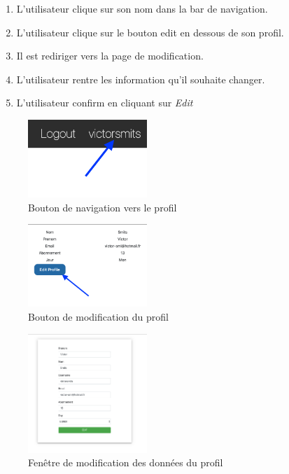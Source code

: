 \begin{enumerate}
	\item L'utilisateur clique sur son nom dans la bar de navigation.
	\item L'utilisateur clique sur le bouton edit en dessous de son profil. 
	\item Il est rediriger vers la page de modification. 
	\item L'utilisateur rentre les information qu'il souhaite changer. 
	\item L'utilisateur confirm en cliquant sur \textit{Edit}
\end{enumerate}

\vspace{\baselineskip}
\begin{figure}[h]
	\includegraphics[width=0.4\textwidth,center]{Figures/us7-1}
	\caption{Bouton de navigation vers le profil}
\end{figure}

\vspace{\baselineskip}
\begin{figure}[h]
	\includegraphics[width=0.4\textwidth,center]{Figures/us8-1}
	\caption{Bouton de modification du profil}
\end{figure}

\newpage
\begin{figure}[h]
	\includegraphics[width=0.4\textwidth,center]{Figures/us8-2}
	\caption{Fenêtre de modification des données du profil}
\end{figure}

